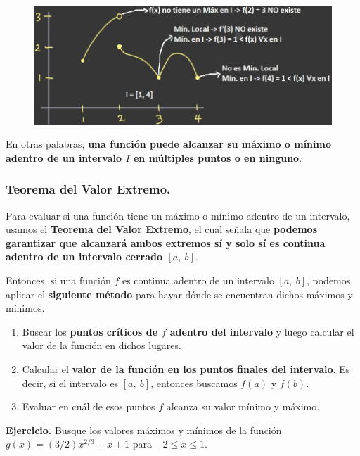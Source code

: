 \documentclass[12pt]{article}
\begin{document}
\begin{figure}[hbt!]
\centering
\includegraphics[scale=0.6]{img/min-max-interval-2.jpg}
\end{figure}

En otras palabras, \textbf{una función puede alcanzar su máximo o mínimo adentro de un intervalo $I$ en múltiples puntos o en ninguno}.


\subsubsection{Teorema del Valor Extremo.}

Para evaluar si una función tiene un máximo o mínimo adentro de un intervalo, usamos el \textbf{Teorema del Valor Extremo}, el cual señala que \textbf{podemos garantizar que alcanzará ambos extremos sí y solo sí es continua adentro de un intervalo cerrado $[a, \ b]$}.

Entonces, si una función $f$ es continua adentro de un intervalo $[a, \ b]$, podemos aplicar el \textbf{siguiente método} para hayar dónde se encuentran dichos máximos y mínimos.

\begin{enumerate}
\item Buscar los \textbf{puntos críticos de $f$ adentro del intervalo} y luego calcular el valor de la función en dichos lugares.

\item Calcular el \textbf{valor de la función en los puntos finales del intervalo}. Es decir, si el intervalo es $[a, \ b]$, entonces buscamos $f(a)$ y $f(b)$.

\item Evaluar en cuál de esos puntos $f$ alcanza su valor mínimo y máximo.
\end{enumerate}

\textbf{Ejercicio.} \quad Busque los valores máximos y mínimos de la función $g(x) = (3/2)x^{2/3} + x + 1$ para $-2 \leq x \leq 1$.
\end{document}
